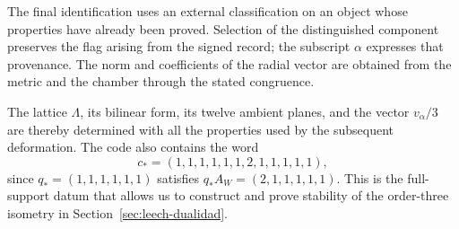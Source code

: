 The final identification uses an external
classification on an object whose properties have already
been proved. Selection of the distinguished
component preserves the flag arising from the
signed record; the subscript \(\alpha\) expresses
that provenance. The norm and coefficients of the
radial vector are obtained from the metric and
the chamber through the stated congruence.

The lattice \(\Lambda\), its bilinear form, its
twelve ambient planes, and the vector \(v_\alpha/3\)
are thereby determined with all the properties
used by the subsequent deformation. The
code also contains the word
\[
 c_*=(1,1,1,1,1,1,2,1,1,1,1,1),
\]
since \(q_*=(1,1,1,1,1,1)\) satisfies
\(q_*A_W=(2,1,1,1,1,1)\). This is the
full-support datum that allows us to construct and
prove stability of the order-three
isometry in Section~\ref{sec:leech-dualidad}.
